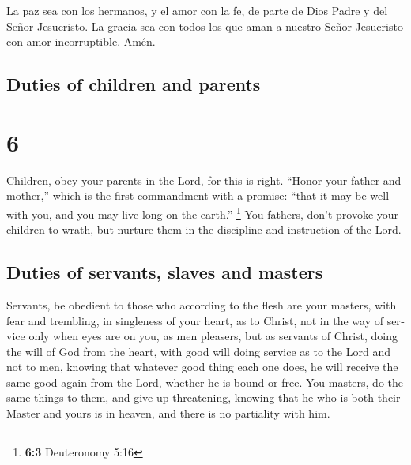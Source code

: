 \begin{paracol}{2}
 La paz sea con los hermanos, y el amor con la fe, de
parte de Dios Padre y del Señor Jesucristo.  La gracia
sea con todos los que aman a nuestro Señor Jesucristo con amor
incorruptible. Amén. \switchcolumn
\begin{otherlanguage}{english}

\hypertarget{duties-of-children-and-parents}{%
\subsection{Duties of children and
parents}\label{duties-of-children-and-parents}}

\hypertarget{section-11}{%
\section{6}\label{section-11}}

 Children, obey your parents in the Lord, for this is
right.  ``Honor your father and mother,'' which is the
first commandment with a promise:  ``that it may be well
with you, and you may live long on the earth.'' \footnote{\textbf{6:3}
  Deuteronomy 5:16}  You fathers, don't provoke your
children to wrath, but nurture them in the discipline and instruction of
the Lord.

\hypertarget{duties-of-servants-slaves-and-masters}{%
\subsection{Duties of servants, slaves and
masters}\label{duties-of-servants-slaves-and-masters}}

 Servants, be obedient to those who according to the flesh
are your masters, with fear and trembling, in singleness of your heart,
as to Christ,  not in the way of service only when eyes
are on you, as men pleasers, but as servants of Christ, doing the will
of God from the heart,  with good will doing service as to
the Lord and not to men,  knowing that whatever good thing
each one does, he will receive the same good again from the Lord,
whether he is bound or free.  You masters, do the same
things to them, and give up threatening, knowing that he who is both
their Master and yours is in heaven, and there is no partiality with
him.

\hypertarget{final-warning-to-the-right-wing-christian-struggle-the-spiritual-armor-of-the-christian-personal-request-of-the-apostle}{%
}
\end{otherlanguage}
\end{paracol}
